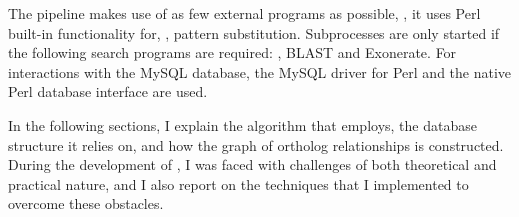 The pipeline makes use of as few external programs as possible, \ie, it
uses Perl built-in functionality for, \eg, pattern substitution. Subprocesses
are only started if the following search programs are required: ,
BLAST and Exonerate. For interactions with the MySQL database, the MySQL driver
 for Perl and the native Perl database
interface  are used.

In the following sections, I explain the algorithm that \pname employs, the
database structure it relies on, and how the graph of ortholog relationships is
constructed. During the development of \pname, I was faced with challenges of
both theoretical and practical nature, and I also report on the techniques that
I implemented to overcome these obstacles.

